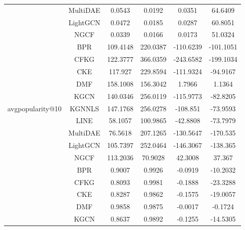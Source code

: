 \begin{table}[H]
{\begin{tabular}{|c|c|c|c|c|c|}
                                   & MultiDAE & 0.0543 & 0.0192 & 0.0351 & 64.6409 \\ \cline{2-6} 
                                   & LightGCN & 0.0472 & 0.0185 & 0.0287 & 60.8051 \\ \cline{2-6} 
                                   & NGCF & 0.0339 & 0.0166 & 0.0173 & 51.0324 \\ \cline{2-6} 
        \hline
        \multirow{11}{*}{avgpopularity@10} & BPR & 109.4148 & 220.0387 & -110.6239 & -101.1051 \\ \cline{2-6} 
                                            & CFKG & 122.3777 & 366.0359 & -243.6582 & -199.1034 \\ \cline{2-6} 
                                            & CKE & 117.927 & 229.8594 & -111.9324 & -94.9167 \\ \cline{2-6} 
                                            & DMF & 158.1008 & 156.3042 & 1.7966 & 1.1364 \\ \cline{2-6} 
                                            & KGCN & 140.0346 & 256.0119 & -115.9773 & -82.8205 \\ \cline{2-6} 
                                            & KGNNLS & 147.1768 & 256.0278 & -108.851 & -73.9593 \\ \cline{2-6} 
                                            & LINE & 58.1057 & 100.9865 & -42.8808 & -73.7979 \\ \cline{2-6} 
                                            & MultiDAE & 76.5618 & 207.1265 & -130.5647 & -170.535 \\ \cline{2-6} 
                                            & LightGCN & 105.7397 & 252.0464 & -146.3067 & -138.365 \\ \cline{2-6} 
                                            & NGCF & 113.2036 & 70.9028 & 42.3008 & 37.367 \\ \cline{2-6} 
        \hline
        \multirow{11}{*}{giniindex@10} & BPR & 0.9007 & 0.9926 & -0.0919 & -10.2032 \\ \cline{2-6} 
                                        & CFKG & 0.8093 & 0.9981 & -0.1888 & -23.3288 \\ \cline{2-6} 
                                        & CKE & 0.8287 & 0.9862 & -0.1575 & -19.0057 \\ \cline{2-6} 
                                        & DMF & 0.9858 & 0.9875 & -0.0017 & -0.1724 \\ \cline{2-6} 
                                        & KGCN & 0.8637 & 0.9892 & -0.1255 & -14.5305 \\ \cline{2-6} 

\end{tabular}}
\end{table}
